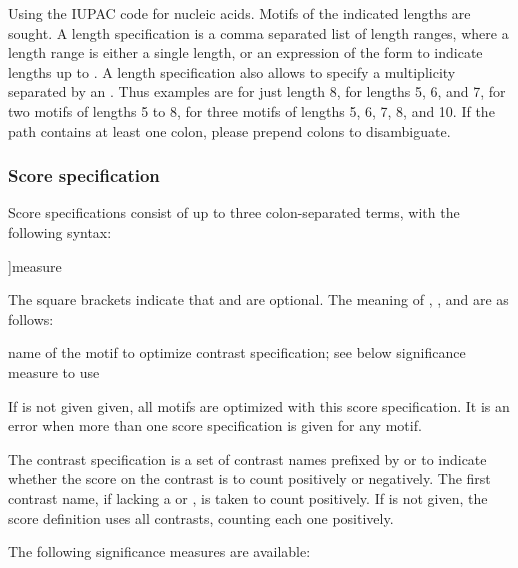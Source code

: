 \documentclass[a4paper]{article}
\begin{document}
\begin{description}
    Using the IUPAC code for nucleic acids.
    Motifs of the indicated lengths are sought.
    A length specification is a comma separated list of length ranges, where a length range is either a single length, or an expression of the form  to indicate lengths  up to .
    A length specification also allows to specify a multiplicity separated by an .
    Thus examples are  for just length 8,  for lengths 5, 6, and 7,  for two motifs of lengths 5 to 8,  for three motifs of lengths 5, 6, 7, 8, and 10.
    If the path contains at least one colon, please prepend colons to disambiguate.
\end{description}


\subsubsection{Score specification}
Score specifications consist of up to three colon-separated terms, with the following syntax:

\begin{verbbox}
[motif:[contrasts:]]measure
\end{verbbox}
\fbox{\theverbbox[t]}

The square brackets indicate that  and  are optional.
The meaning of , , and  are as follows:

\begin{description}
    name of the motif to optimize
    contrast specification; see below
    significance measure to use
\end{description}

If  is not given given, all motifs are optimized with this score specification.
It is an error when more than one score specification is given for any motif.

The contrast specification  is a set of contrast names prefixed by \Q{+} or \Q{-} to indicate whether the score on the contrast is to count positively or negatively.
The first contrast name, if lacking a \Q{+} or \Q{-}, is taken to count positively.
If  is not given, the score definition uses all contrasts, counting each one positively.

The following significance measures are available:
\end{document}
